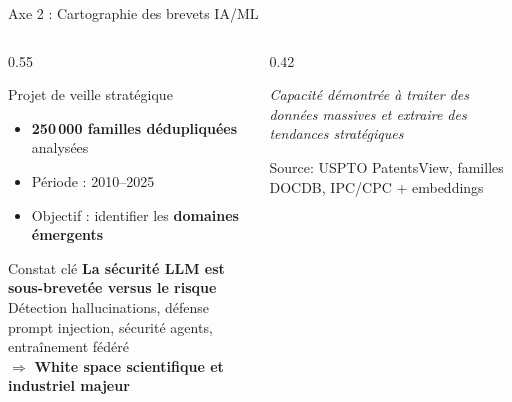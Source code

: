 \documentclass[aspectratio=169,11pt]{beamer}
\begin{document}
\begin{frame}{Axe 2 : Cartographie des brevets IA/ML}
  \begin{columns}[T]
    \begin{column}{0.55\textwidth}
      \begin{block}{Projet de veille stratégique}
        \begin{itemize}\small
          \item \textbf{250\,000 familles dédupliquées} analysées
          \item Période : 2010--2025
          \item Objectif : identifier les \textbf{domaines émergents}
        \end{itemize}
      \end{block}
      
      \vspace{0.3em}
      
      \begin{exampleblock}{Constat clé}
        \small
        \textbf{La sécurité LLM est sous-brevetée versus le risque}\\[0.3em]
        {\footnotesize Détection hallucinations, défense prompt injection, sécurité agents, entraînement fédéré}\\
        \vspace{0.3em}
        $\Rightarrow$ \textbf{White space scientifique et industriel majeur}
      \end{exampleblock}
    \end{column}
    \begin{column}{0.42\textwidth}
      \centering
      
      \vspace{0.5em}
      
      {\footnotesize\textit{Capacité démontrée à traiter des données massives et extraire des tendances stratégiques}}
      
      \vspace{0.3em}
      
      {\scriptsize Source: USPTO PatentsView, familles DOCDB, IPC/CPC + embeddings}
    \end{column}
  \end{columns}
\end{frame}
\end{document}
